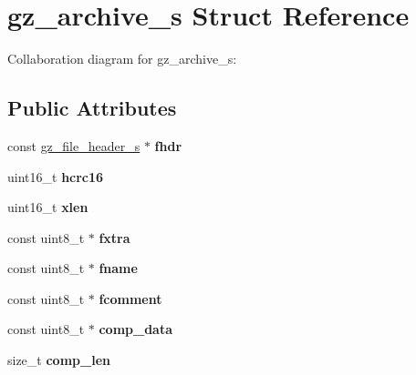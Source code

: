 \hypertarget{structgz__archive__s}{}\section{gz\+\_\+archive\+\_\+s Struct Reference}
\label{structgz__archive__s}


Collaboration diagram for gz\+\_\+archive\+\_\+s\+:
\subsection*{Public Attributes}
\begin{DoxyCompactItemize}
\item 
const \hyperlink{structgz__file__header__s}{gz\+\_\+file\+\_\+header\+\_\+s} $\ast$ {\bfseries fhdr}\hypertarget{structgz__archive__s_ad135b0f917918df6ba0e3b291625225c}{}\label{structgz__archive__s_ad135b0f917918df6ba0e3b291625225c}

\item 
uint16\+\_\+t {\bfseries hcrc16}\hypertarget{structgz__archive__s_a7a2f562c54c87b26808fd07fb0dbc76c}{}\label{structgz__archive__s_a7a2f562c54c87b26808fd07fb0dbc76c}

\item 
uint16\+\_\+t {\bfseries xlen}\hypertarget{structgz__archive__s_a2cdda83e36176220c83287684a33d56d}{}\label{structgz__archive__s_a2cdda83e36176220c83287684a33d56d}

\item 
const uint8\+\_\+t $\ast$ {\bfseries fxtra}\hypertarget{structgz__archive__s_ae1eca54d609be5caa6052f9dfc99fb75}{}\label{structgz__archive__s_ae1eca54d609be5caa6052f9dfc99fb75}

\item 
const uint8\+\_\+t $\ast$ {\bfseries fname}\hypertarget{structgz__archive__s_aff377a03c9f5c13419ed3379712a1af1}{}\label{structgz__archive__s_aff377a03c9f5c13419ed3379712a1af1}

\item 
const uint8\+\_\+t $\ast$ {\bfseries fcomment}\hypertarget{structgz__archive__s_a79fd7788028396daa6da828c0a3273a8}{}\label{structgz__archive__s_a79fd7788028396daa6da828c0a3273a8}

\item 
const uint8\+\_\+t $\ast$ {\bfseries comp\+\_\+data}\hypertarget{structgz__archive__s_a52640a878e00857ae056d09a9484fe83}{}\label{structgz__archive__s_a52640a878e00857ae056d09a9484fe83}

\item 
size\+\_\+t {\bfseries comp\+\_\+len}\hypertarget{structgz__archive__s_a4dcb764e32ab8a87832ccc7326dd625e}{}\label{structgz__archive__s_a4dcb764e32ab8a87832ccc7326dd625e}


\end{DoxyCompactItemize}
